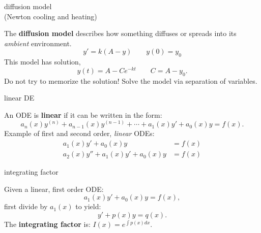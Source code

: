 \documentclass[avery5371,grid]{flashcards}
\newcommand{\defn}[1]{\textbf{#1}}
\begin{document}
\begin{flashcard}[Definition]{diffusion model \\ (Newton cooling and heating)}

  The \defn{diffusion model} describes how something diffuses or
  spreads into its \emph{ambient} environment.
  \[
    y' = k(A-y) \qquad y(0) = y_0
  \]
  This model has solution,
  \[
    y(t) = A - Ce^{-kt} \qquad C = A-y_0.
  \]
  Do not try to memorize the solution! Solve the model via separation
  of variables.

\end{flashcard}

\begin{flashcard}[Definition]{linear DE}

  An ODE is \defn{linear} if it can be written in the form:
  \[
    a_n(x)y^{(n)} + a_{n-1}(x)y^{(n-1)} + \cdots + a_1(x)y' + a_0(x)y
    = f(x).
  \]
  Example of first and second order, \emph{linear}  ODEs:
  \begin{align*}
    a_1(x)y' + a_0(x)y &= f(x) \\
    a_2(x)y'' + a_1(x)y' + a_0(x)y &= f(x)
  \end{align*}

\end{flashcard}

\begin{flashcard}[Definition]{integrating factor}

  Given a linear, first order ODE:
  \[
    a_1(x)y' + a_0(x)y = f(x),
  \]
  first divide by $a_1(x)$ to yield:
  \[
    y' + p(x)y = q(x).
  \]
  The \defn{integrating factor} is: \( I(x) = e^{\int \! p(x) dx}. \)

\end{flashcard}
\end{document}
